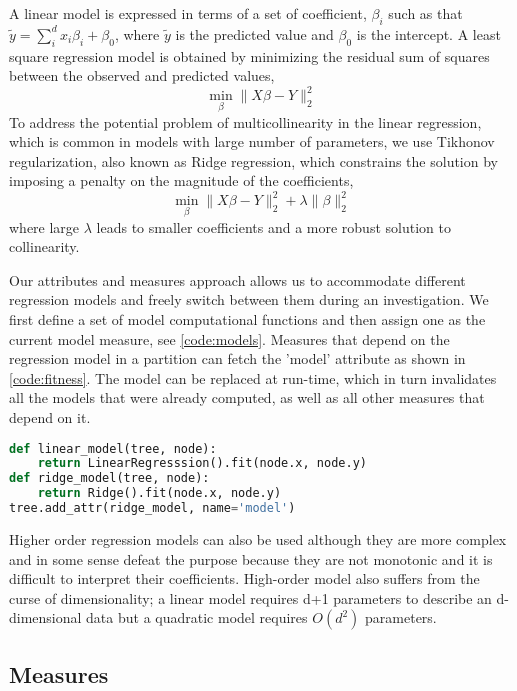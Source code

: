 A linear model is expressed in terms of a set of coefficient, $\beta_i$ such as that $ \tilde{y} = \sum_i^d x_i \beta_i + \beta_0$,
where $\tilde{y}$ is the predicted value and $\beta_0$ is the intercept. A least square regression model is obtained by minimizing the residual sum of squares between the observed and predicted values, 
\[ \min_\beta\| X\beta - Y \|_2^2 \]
To address the potential problem of multicollinearity in the linear regression, which is common in models with large number of parameters, we use Tikhonov regularization, also known as Ridge regression, which constrains the solution by imposing a penalty on the magnitude of the coefficients,
\[ \min_\beta\| X\beta - Y \|_2^2 + \lambda\| \beta \|_2^2 \]
where large $\lambda$ leads to smaller coefficients and a more robust solution to collinearity.

Our attributes and measures approach allows us to accommodate different regression models and freely switch between them during an investigation. We first define a set of model computational functions and then assign one as the current model measure, see \autoref{code:models}. Measures that depend on the regression model in a partition can fetch the 'model' attribute as shown in \autoref{code:fitness}. The model can be replaced at run-time, which in turn invalidates all the models that were already computed, as well as all other measures that depend on it.  

\begin{lstlisting}[language=Python,caption=Using different regression models., 
    float=hbt, label=code:models]
def linear_model(tree, node):
    return LinearRegresssion().fit(node.x, node.y)
def ridge_model(tree, node):
    return Ridge().fit(node.x, node.y)
tree.add_attr(ridge_model, name='model')
\end{lstlisting}

Higher order regression models can also be used although they are more complex and in some sense defeat the purpose because they are not monotonic and it is difficult to interpret their coefficients. High-order model also suffers from the curse of dimensionality; a linear model requires d+1 parameters to describe an d-dimensional data but a quadratic model requires $O(d^2)$ parameters.



\vspace{-.05in}
\subsection{Measures}
\label{sec:measures}

